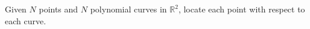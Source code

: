 \begin{problem}[%
	name={Offline Polynomial Range Searching}%
]
    Given $N$ points and $N$ polynomial curves in $\mathbb{R}^2$, locate
    each point with respect to each curve.
\end{problem}
